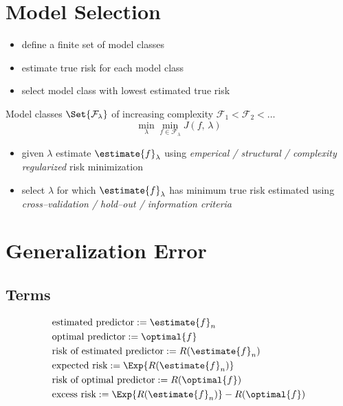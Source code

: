\documentclass[18pt,a3paper,landscape, ncols=3]{cheatsheet}
\begin{document}
\section{Model Selection} \seperator
	\begin{mdframed}
		\begin{itemize}
			\item define a finite set of model classes
			\item estimate true risk for each model class
			\item select model class with lowest estimated true risk
		\end{itemize}
	\end{mdframed}
	\begin{mdframed}
		Model classes \(\Set{\mathcal{F}_{\lambda}}\) of increasing complexity \(\mathcal{F}_{1} < \mathcal{F}_{2} < \ldots\)
		\[\min_{\lambda} \min_{f \in \mathcal{F}_{\lambda}} J(f,\, \lambda)\]
		\begin{itemize}
			\item given \(\lambda\) estimate \(\estimate{f}_{\lambda}\) using \textit{emperical / structural / complexity regularized} risk minimization
			\item select \(\lambda\) for which \(\estimate{f}_{\lambda}\) has minimum true risk estimated using \textit{cross--validation / hold--out / information criteria}
		\end{itemize}
	\end{mdframed}

\section{Generalization Error} \seperator
	\subsection{Terms}
		\begin{mdframed}
			\begin{align*}
				& \text{estimated predictor} := \estimate{f}_{n} \\
				& \text{optimal predictor} := \optimal{f} \\
				& \text{risk of estimated predictor} := R(\estimate{f}_{n}) \\
				& \text{expected risk} := \Exp{R(\estimate{f}_{n})} \\
				& \text{risk of optimal predictor} := R(\optimal{f}) \\
				& \text{excess risk} := \Exp{R(\estimate{f}_{n})} - R(\optimal{f})
			\end{align*}
		\end{mdframed}
\end{document}
